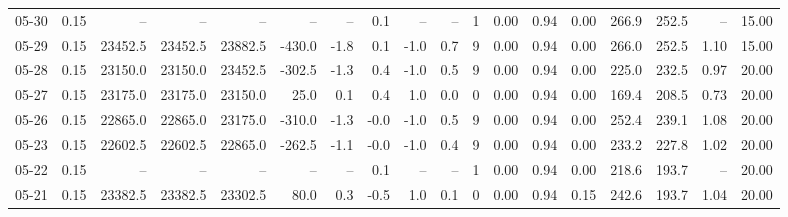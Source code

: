\begin{threeparttable}
{\begin{tabular}{lrrrrrrrrrrrrrrrrr}
  05-30 &     0.15 &      -- &      -- &      -- &         -- &             -- &                       0.1 &                       -- &                  -- &              1 &       0.00 &      0.94 &           0.00 &            266.9 &               252.5 &              -- &                  15.00 \\
  05-29 &     0.15 & 23452.5 & 23452.5 & 23882.5 &     -430.0 &           -1.8 &                       0.1 &                     -1.0 &                 0.7 &              9 &       0.00 &      0.94 &           0.00 &            266.0 &               252.5 &            1.10 &                  15.00 \\
  05-28 &     0.15 & 23150.0 & 23150.0 & 23452.5 &     -302.5 &           -1.3 &                       0.4 &                     -1.0 &                 0.5 &              9 &       0.00 &      0.94 &           0.00 &            225.0 &               232.5 &            0.97 &                  20.00 \\
  05-27 &     0.15 & 23175.0 & 23175.0 & 23150.0 &       25.0 &            0.1 &                       0.4 &                      1.0 &                 0.0 &              0 &       0.00 &      0.94 &           0.00 &            169.4 &               208.5 &            0.73 &                  20.00 \\
  05-26 &     0.15 & 22865.0 & 22865.0 & 23175.0 &     -310.0 &           -1.3 &                      -0.0 &                     -1.0 &                 0.5 &              9 &       0.00 &      0.94 &           0.00 &            252.4 &               239.1 &            1.08 &                  20.00 \\
  05-23 &     0.15 & 22602.5 & 22602.5 & 22865.0 &     -262.5 &           -1.1 &                      -0.0 &                     -1.0 &                 0.4 &              9 &       0.00 &      0.94 &           0.00 &            233.2 &               227.8 &            1.02 &                  20.00 \\
  05-22 &     0.15 &      -- &      -- &      -- &         -- &             -- &                       0.1 &                       -- &                  -- &              1 &       0.00 &      0.94 &           0.00 &            218.6 &               193.7 &              -- &                  20.00 \\
  05-21 &     0.15 & 23382.5 & 23382.5 & 23302.5 &       80.0 &            0.3 &                      -0.5 &                      1.0 &                 0.1 &              0 &       0.00 &      0.94 &           0.15 &            242.6 &               193.7 &            1.04 &                  20.00 \\

\end{tabular}}
\end{threeparttable}
